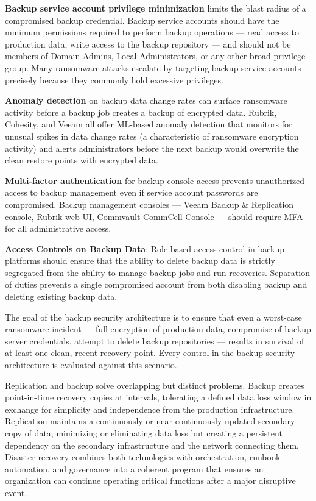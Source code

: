 \textbf{Backup service account privilege minimization} limits the blast radius of a compromised backup credential. Backup service accounts should have the minimum permissions required to perform backup operations --- read access to production data, write access to the backup repository --- and should not be members of Domain Admins, Local Administrators, or any other broad privilege group. Many ransomware attacks escalate by targeting backup service accounts precisely because they commonly hold excessive privileges.

\textbf{Anomaly detection} on backup data change rates can surface ransomware activity before a backup job creates a backup of encrypted data. Rubrik, Cohesity, and Veeam all offer ML-based anomaly detection that monitors for unusual spikes in data change rates (a characteristic of ransomware encryption activity) and alerts administrators before the next backup would overwrite the clean restore points with encrypted data.

\textbf{Multi-factor authentication} for backup console access prevents unauthorized access to backup management even if service account passwords are compromised. Backup management consoles --- Veeam Backup \& Replication console, Rubrik web UI, Commvault CommCell Console --- should require MFA for all administrative access.

\textbf{Access Controls on Backup Data}: Role-based access control in backup platforms should ensure that the ability to delete backup data is strictly segregated from the ability to manage backup jobs and run recoveries. Separation of duties prevents a single compromised account from both disabling backup and deleting existing backup data.

The goal of the backup security architecture is to ensure that even a worst-case ransomware incident --- full encryption of production data, compromise of backup server credentials, attempt to delete backup repositories --- results in survival of at least one clean, recent recovery point. Every control in the backup security architecture is evaluated against this scenario.


Replication and backup solve overlapping but distinct problems. Backup creates point-in-time recovery copies at intervals, tolerating a defined data loss window in exchange for simplicity and independence from the production infrastructure. Replication maintains a continuously or near-continuously updated secondary copy of data, minimizing or eliminating data loss but creating a persistent dependency on the secondary infrastructure and the network connecting them. Disaster recovery combines both technologies with orchestration, runbook automation, and governance into a coherent program that ensures an organization can continue operating critical functions after a major disruptive event.

